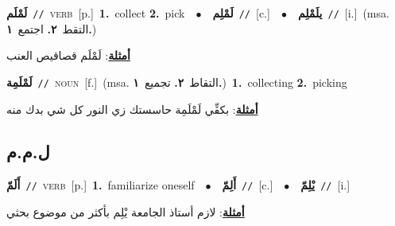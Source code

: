 \documentclass[10pt,a4paper,twoside]{article} %
\begin{document}
\begin{multicols}{2}
{\setlength\topsep{0pt}\textbf{\foreignlanguage{arabic}{لَمْلَم}}\ {\color{gray}\texttt{//}\color{black}}\ \textsc{verb}\ [p.]\ \textbf{1.}~collect  \textbf{2.}~pick\ \ $\bullet$\ \ \setlength\topsep{0pt}\textbf{\foreignlanguage{arabic}{لَمْلِم}}\ {\color{gray}\texttt{//}\color{black}}\ [c.]\ \ $\bullet$\ \ \setlength\topsep{0pt}\textbf{\foreignlanguage{arabic}{يلَمْلِم}}\ {\color{gray}\texttt{//}\color{black}}\ [i.]\ \color{gray}(msa. \foreignlanguage{arabic}{التقط}~\foreignlanguage{arabic}{\textbf{٢.}}  \foreignlanguage{arabic}{اجتمع}~\foreignlanguage{arabic}{\textbf{١.}})\color{black}\  \begin{flushright}\color{gray}\foreignlanguage{arabic}{\textbf{\underline{\foreignlanguage{arabic}{أمثلة}}}: لَمْلَم قصاقيص العنب}\end{flushright}\color{black}} \vspace{2mm}

{\setlength\topsep{0pt}\textbf{\foreignlanguage{arabic}{لَمْلَمِة}}\ {\color{gray}\texttt{//}\color{black}}\ \textsc{noun}\ [f.]\ \color{gray}(msa. \foreignlanguage{arabic}{التقاط}~\foreignlanguage{arabic}{\textbf{٢.}}  \foreignlanguage{arabic}{تجميع}~\foreignlanguage{arabic}{\textbf{١.}})\color{black}\ \textbf{1.}~collecting  \textbf{2.}~picking\  \begin{flushright}\color{gray}\foreignlanguage{arabic}{\textbf{\underline{\foreignlanguage{arabic}{أمثلة}}}: بكفِّي لَمْلَمِة حاسستك زي النور كل شي بدك منه}\end{flushright}\color{black}} \vspace{2mm}

\vspace{-3mm}
\subsection*{\color{blue}\foreignlanguage{arabic}{ل.م.م}\color{blue}{}} 

{\setlength\topsep{0pt}\textbf{\foreignlanguage{arabic}{أَلَمّ}}\ {\color{gray}\texttt{//}\color{black}}\ \textsc{verb}\ [p.]\ \textbf{1.}~familiarize oneself\ \ $\bullet$\ \ \setlength\topsep{0pt}\textbf{\foreignlanguage{arabic}{أَلِمّ}}\ {\color{gray}\texttt{//}\color{black}}\ [c.]\ \ $\bullet$\ \ \setlength\topsep{0pt}\textbf{\foreignlanguage{arabic}{يْلِمّ}}\ {\color{gray}\texttt{//}\color{black}}\ [i.]\  \begin{flushright}\color{gray}\foreignlanguage{arabic}{\textbf{\underline{\foreignlanguage{arabic}{أمثلة}}}: لازم أستاذ الجامعة يْلِم بأكثر من موضوع بحثي}\end{flushright}\color{black}} \vspace{2mm}


\end{multicols}
\end{document}
